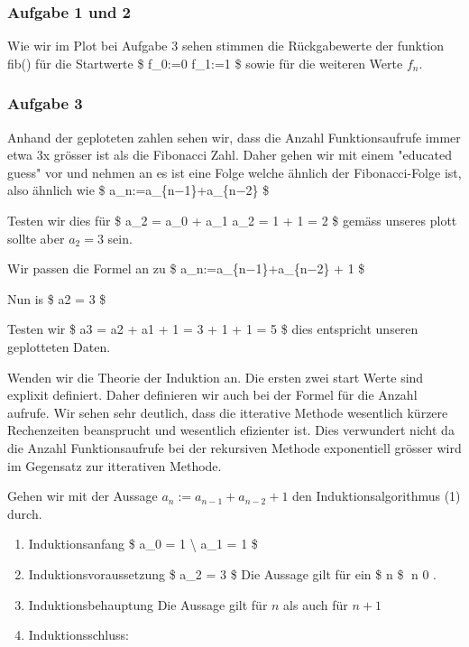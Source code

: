 \documentclass[11pt]{article}
\begin{document}
\subsubsection{Aufgabe 1 und 2}\label{aufgabe-1-und-2}

Wie wir im Plot bei Aufgabe 3 sehen stimmen die Rückgabewerte der
funktion fib() für die Startwerte \$ f\_0:=0  f\_1:=1 \$
sowie für die weiteren Werte \(f_n\).

\subsubsection{Aufgabe 3}\label{aufgabe-3}

Anhand der geploteten zahlen sehen wir, dass die Anzahl Funktionsaufrufe
immer etwa 3x grösser ist als die Fibonacci Zahl. Daher gehen wir mit
einem "educated guess" vor und nehmen an es ist eine Folge welche
ähnlich der Fibonacci-Folge ist, also ähnlich wie \$
a\_n:=a\_\{n−1\}+a\_\{n−2\} \$

Testen wir dies für \$ a\_2 = a\_0 + a\_1 a\_2 = 1 + 1 = 2 \$ gemäss
unseres plott sollte aber \(a_2 = 3\) sein.

Wir passen die Formel an zu \$ a\_n:=a\_\{n−1\}+a\_\{n−2\} + 1 \$

Nun is \$ a2 = 3 \$

Testen wir \$ a3 = a2 + a1 + 1 = 3 + 1 + 1 = 5 \$ dies entspricht
unseren geplotteten Daten.

Wenden wir die Theorie der Induktion an. Die ersten zwei start Werte
sind explixit definiert. Daher definieren wir auch bei der Formel für
die Anzahl aufrufe. Wir sehen sehr deutlich, dass die itterative Methode
wesentlich kürzere Rechenzeiten beansprucht und wesentlich efizienter
ist. Dies verwundert nicht da die Anzahl Funktionsaufrufe bei der
rekursiven Methode exponentiell grösser wird im Gegensatz zur
itterativen Methode.

Gehen wir mit der Aussage \(a_n:=a_{n−1}+a_{n−2}+1\) den
Induktionsalgorithmus (1) durch.

\begin{enumerate}
\def\labelenumi{\arabic{enumi}.}
\item
  Induktionsanfang \$ a\_0 = 1 \textbackslash{} a\_1 = 1 \$
\item
  Induktionsvoraussetzung \$ a\_2 = 3 \$ Die Aussage gilt für ein \$ n
  \in {} \$ n 0 .
\item
  Induktionsbehauptung Die Aussage gilt für \(n\) als auch für \(n+1\)
\item
  Induktionsschluss:
\end{enumerate}
\end{document}
